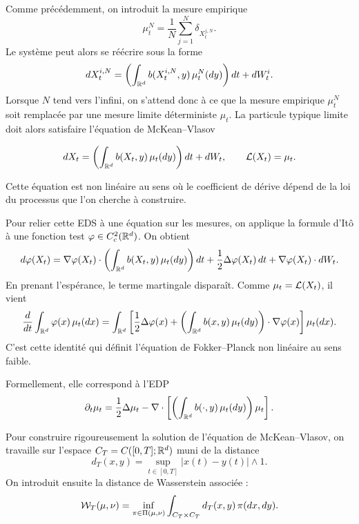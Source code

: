 Comme précédemment, on introduit la mesure empirique
\[
	\mu_t^N
	=
	\frac1N
	\sum_{j=1}^{N}
	\delta_{X_t^{j,N}}.
\]
Le système peut alors se réécrire sous la forme
\[
	dX_t^{i,N}
	=
	\left(
	\int_{\mathbb{R}^d}
	b(X_t^{i,N},y)\,\mu_t^N(dy)
	\right)dt
	+
	dW_t^i.
\]
Lorsque $N$ tend vers l'infini, on s'attend donc à ce que la mesure empirique $\mu_t^N$
soit remplacée par une mesure limite déterministe $\mu_t$. La particule typique limite
doit alors satisfaire l'équation de McKean--Vlasov
\begin{important}
	\begin{equation}
		dX_t
		=
		\left(
		\int_{\mathbb{R}^d}
		b(X_t,y)\,\mu_t(dy)
		\right)dt
		+
		dW_t,
		\qquad
		\mathcal{L}(X_t)=\mu_t.
		\label{eq:mckean_vlasov_sde}
	\end{equation}
\end{important}
Cette équation est non linéaire au sens où le coefficient de dérive dépend de la loi
du processus que l'on cherche à construire.

Pour relier cette EDS à une équation sur les mesures, on applique la formule d'Itô à une
fonction test $\varphi\in C_c^2(\mathbb{R}^d)$. On obtient
\[
	d\varphi(X_t)
	=
	\nabla\varphi(X_t)\cdot
	\left(
	\int_{\mathbb{R}^d}
	b(X_t,y)\,\mu_t(dy)
	\right)dt
	+
	\frac12\Delta\varphi(X_t)\,dt
	+
	\nabla\varphi(X_t)\cdot dW_t.
\]
En prenant l'espérance, le terme martingale disparaît. Comme $\mu_t=\mathcal{L}(X_t)$, il vient
\[
	\frac{d}{dt}
	\int_{\mathbb{R}^d}
	\varphi(x)\,\mu_t(dx)
	=
	\int_{\mathbb{R}^d}
	\left[
		\frac12\Delta\varphi(x)
		+
		\left(
		\int_{\mathbb{R}^d}
		b(x,y)\,\mu_t(dy)
		\right)\cdot\nabla\varphi(x)
		\right]
	\mu_t(dx).
\]
C'est cette identité qui définit l'équation de Fokker--Planck non linéaire au sens faible.

\begin{important}
	Formellement, elle correspond à l'EDP
	\begin{equation}
		\partial_t\mu_t
		=
		\frac12\Delta\mu_t
		-
		\nabla\cdot
		\left[
			\left(
			\int_{\mathbb{R}^d}
			b(\cdot,y)\,\mu_t(dy)
			\right)\mu_t
			\right].
		\label{eq:fokker_planck_mckean_vlasov}
	\end{equation}
\end{important}

Pour construire rigoureusement la solution de l'équation de McKean--Vlasov, on travaille
sur l'espace $C_T=C([0,T];\mathbb{R}^d)$ muni de la distance
\[
	d_T(x,y)
	=
	\sup_{t\in[0,T]}|x(t)-y(t)|\wedge 1.
\]
On introduit ensuite la distance de Wasserstein associée :
\[
	\mathcal{W}_T(\mu,\nu)
	=
	\inf_{\pi\in\Pi(\mu,\nu)}
	\int_{C_T\times C_T}
	d_T(x,y)\,\pi(dx,dy).
\]

